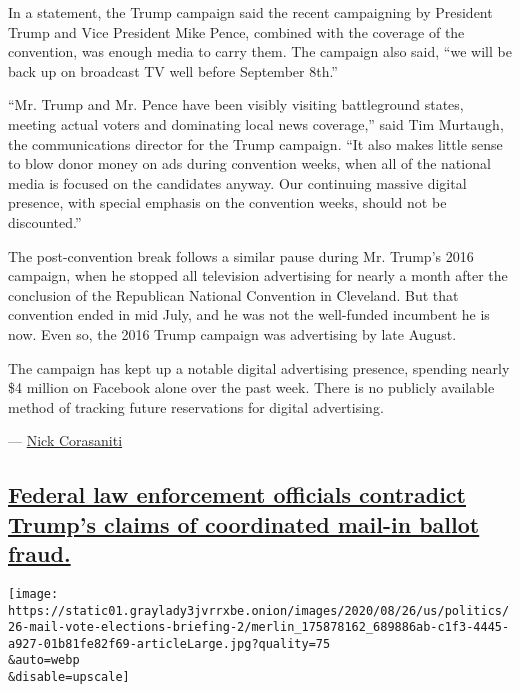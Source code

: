 In a statement, the Trump campaign said the recent campaigning by
President Trump and Vice President Mike Pence, combined with the
coverage of the convention, was enough media to carry them. The campaign
also said, ``we will be back up on broadcast TV well before September
8th.''

``Mr. Trump and Mr. Pence have been visibly visiting battleground
states, meeting actual voters and dominating local news coverage,'' said
Tim Murtaugh, the communications director for the Trump campaign. ``It
also makes little sense to blow donor money on ads during convention
weeks, when all of the national media is focused on the candidates
anyway. Our continuing massive digital presence, with special emphasis
on the convention weeks, should not be discounted.''

The post-convention break follows a similar pause during Mr. Trump's
2016 campaign, when he stopped all television advertising for nearly a
month after the conclusion of the Republican National Convention in
Cleveland. But that convention ended in mid July, and he was not the
well-funded incumbent he is now. Even so, the 2016 Trump campaign was
advertising by late August.

The campaign has kept up a notable digital advertising presence,
spending nearly \$4 million on Facebook alone over the past week. There
is no publicly available method of tracking future reservations for
digital advertising.

--- \href{https://www.nytimes3xbfgragh.onion/by/nick-corasaniti}{Nick
Corasaniti}

\hypertarget{federal-law-enforcement-officials-contradict-trumps-claims-of-coordinated-mail-in-ballot-fraud}{%
\subsection{\texorpdfstring{\protect\hyperlink{federal-law-enforcement-officials-contradict-trumps-claims-of-coordinated-mail-in-ballot-fraud}{Federal
law enforcement officials contradict Trump's claims of coordinated
mail-in ballot
fraud.}}{Federal law enforcement officials contradict Trump's claims of coordinated mail-in ballot fraud.}}\label{federal-law-enforcement-officials-contradict-trumps-claims-of-coordinated-mail-in-ballot-fraud}}

\texttt{[image: https://static01.graylady3jvrrxbe.onion/images/2020/08/26/us/politics/26-mail-vote-elections-briefing-2/merlin\_175878162\_689886ab-c1f3-4445-a927-01b81fe82f69-articleLarge.jpg?quality=75\\\&auto=webp\\\&disable=upscale]}

